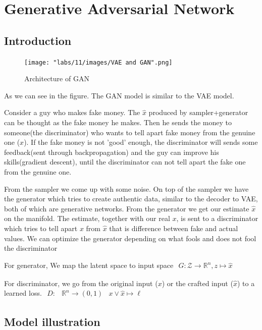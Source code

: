 \section{Generative Adversarial Network}
\subsection{Introduction}
\begin{figure}
    \centering
    \texttt{[image: "labs/11/images/VAE and GAN".png]}
    \caption{Architecture of GAN}
    \label{fig:my_label}
\end{figure}

As we can see in the figure. The GAN model is similar to the VAE model.

Consider a guy who makes fake money. The $\hat{x}$ produced by sampler+generator can be thought as the fake money he makes. Then he sends the money to someone(the discriminator) who wants to tell apart fake money from the genuine one ($x$). If the fake money is not 'good' enough, the discriminator will sends some feedback(sent through backpropagation) and the guy can improve his skills(gradient descent), until the discriminator can not tell apart the fake one from the genuine one. 

From the sampler we come up with some noise. On top of the sampler we have the generator which tries to create authentic data, similar to the decoder to VAE, both of which are generative networks. From the generator we get our estimate $\hat{x}$on the manifold. The estimate, together with our real $x$, is sent to a discriminator which tries to tell apart $x$ from $\hat{x}$ that is difference between fake and actual values. We can optimize the generator depending on what fools and does not fool the discriminator

For generator, We map the latent space to input space $\begin{array}{r}{G : \mathcal{Z} \rightarrow \mathbb{R}^{n}}, {z \mapsto \hat{x}}\end{array}$

For discriminator, we go from the original input ($x$) or the crafted input ($\hat{x}$) to a learned loss. $\begin{aligned} D : & \mathbb{R}^{n} \rightarrow(0,1) & x \vee \hat{x} \mapsto \ell \end{aligned}$

\subsection{Model illustration}

